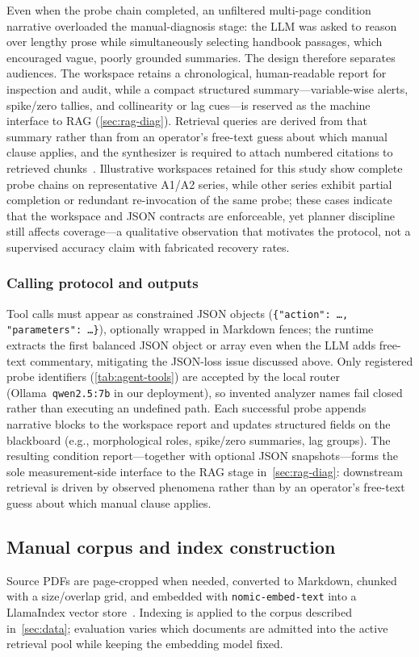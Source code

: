 Even when the probe chain completed, an unfiltered multi-page condition narrative overloaded the
manual-diagnosis stage: the LLM was asked to reason over lengthy prose while simultaneously selecting
handbook passages, which encouraged vague, poorly grounded summaries.
The design therefore separates audiences.
The workspace retains a chronological, human-readable report for inspection and audit, while a compact
structured summary---variable-wise alerts, spike/zero tallies, and collinearity or lag cues---is
reserved as the machine interface to RAG (\cref{sec:rag-diag}).
Retrieval queries are derived from that summary rather than from an operator's free-text guess about
which manual clause applies, and the synthesizer is required to attach numbered citations to retrieved
chunks~\citep{ji2023hallucination}.
Illustrative workspaces retained for this study show complete probe chains on representative A1/A2
series, while other series exhibit partial completion or redundant re-invocation of the same probe;
these cases indicate that the workspace and JSON contracts are enforceable, yet planner discipline
still affects coverage---a qualitative observation that motivates the protocol, not a supervised
accuracy claim with fabricated recovery rates.

\subsubsection{Calling protocol and outputs}
Tool calls must appear as constrained JSON objects
(\texttt{\{"action": \ldots, "parameters": \ldots\}}), optionally wrapped in Markdown fences; the
runtime extracts the first balanced JSON object or array even when the LLM adds free-text commentary,
mitigating the JSON-loss issue discussed above.
Only registered probe identifiers (\cref{tab:agent-tools}) are accepted by the local router
(Ollama~\texttt{qwen2.5:7b} in our deployment), so invented analyzer names fail closed rather than
executing an undefined path.
Each successful probe appends narrative blocks to the workspace report and updates structured fields on
the blackboard (e.g., morphological roles, spike/zero summaries, lag groups).
The resulting condition report---together with optional JSON snapshots---forms the sole
measurement-side interface to the RAG stage in~\cref{sec:rag-diag}: downstream retrieval is driven by
observed phenomena rather than by an operator's free-text guess about which manual clause applies.

\subsection{Manual corpus and index construction}
\label{sec:index}
Source PDFs are page-cropped when needed, converted to Markdown, chunked with a size/overlap grid, and
embedded with \texttt{nomic-embed-text} into a LlamaIndex vector store~\citep{liu2023llamaindex}.
Indexing is applied to the corpus described in~\cref{sec:data}; evaluation varies which documents are
admitted into the active retrieval pool while keeping the embedding model fixed.

